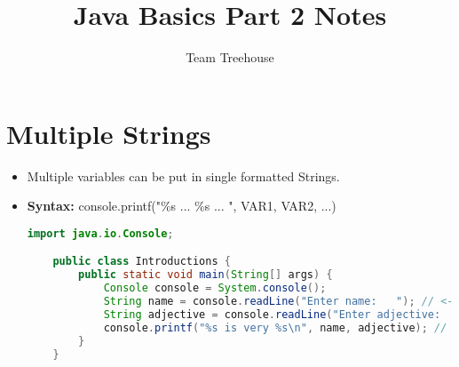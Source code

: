 \documentclass[12pt]{article}
\begin{document}
\title{Java Basics Part 2 Notes}
\author{Team Treehouse}
\maketitle

\section{Multiple Strings}

\bigskip

\begin{itemize}
    \item Multiple variables can be put in single formatted Strings.
    \item \textbf{Syntax:} console.printf("\%s ... \%s ... ", VAR1, VAR2, ...)
    \bigskip

    \begin{lstlisting}[language=java]
    import java.io.Console;

    public class Introductions {
        public static void main(String[] args) {
            Console console = System.console();
            String name = console.readLine("Enter name:   "); // <- Let's write 'Moe' here
            String adjective = console.readLine("Enter adjective:   ");
            console.printf("%s is very %s\n", name, adjective); // <- and 'glad to be with his love' here :)
        }
    }
    \end{lstlisting}

\end{itemize}
\end{document}
